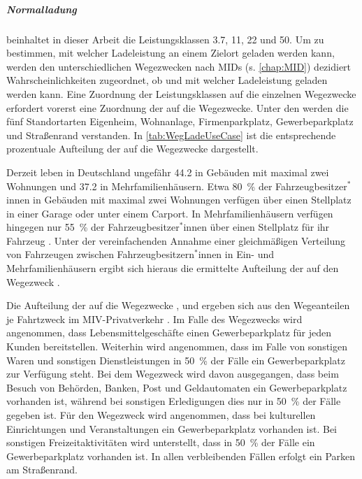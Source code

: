 \subparagraph{Normalladung} beinhaltet in dieser Arbeit die Leistungsklassen \SI{3.7}{\kw}, \SI{11}{\kw}, \SI{22}{\kw} und \SI{50}{\kw}.
Um zu bestimmen, mit welcher Ladeleistung an einem Zielort geladen werden kann, werden den unterschiedlichen Wegezwecken nach \glspl{MID} (s. \autoref{chap:MID}) dezidiert Wahrscheinlichkeiten zugeordnet, ob und mit welcher Ladeleistung geladen werden kann.
Eine Zuordnung der Leistungsklassen auf die einzelnen Wegezwecke erfordert vorerst eine Zuordnung der \UCs auf die Wegezwecke.
Unter den \UCs werden die fünf Standortarten Eigenheim, Wohnanlage, Firmenparkplatz, Gewerbeparkplatz und Straßenrand verstanden.
In \autoref{tab:WegLadeUseCase} ist die entsprechende prozentuale Aufteilung der \UCs auf die Wegezwecke dargestellt.



Derzeit leben in Deutschland ungefähr \SI{44.2}{\MioMen} in Gebäuden mit maximal zwei Wohnungen und \SI{37.2}{\MioMen} in Mehrfamilienhäusern.
Etwa \SI{80}{\percent} der \linebreak Fahrzeugbesitzer$^*$innen in Gebäuden mit maximal zwei Wohnungen verfügen über einen Stellplatz in einer Garage oder unter einem Carport.
In Mehrfamilienhäusern verfügen hingegen nur \SI{55}{\percent} der Fahrzeugbesitzer$^*$innen über einen Stellplatz für ihr Fahrzeug \cite{dena2020}.
Unter der vereinfachenden Annahme einer gleichmäßigen Verteilung von Fahrzeugen zwischen Fahrzeugbesitzern$^*$innen in Ein- und Mehrfamilienhäusern ergibt sich hieraus die ermittelte Aufteilung der \UCs auf den Wegezweck \nHdot.\medskip

Die Aufteilung der \UCs auf die Wegezwecke \Einkaufdot, \Erledigung und \Freizeit ergeben sich aus den Wegeanteilen je Fahrtzweck im \gls{MIV}-Privatverkehr \cite{Rikus2015}.
Im Falle des Wegezwecks \Einkauf wird angenommen, dass Lebensmittelgeschäfte einen Gewerbeparkplatz für jeden Kunden bereitstellen.
Weiterhin wird angenommen, dass im Falle von sonstigen Waren und sonstigen Dienstleistungen in \SI{50}{\percent} der Fälle ein Gewerbeparkplatz zur Verfügung steht.
Bei dem Wegezweck \Erledigung wird davon ausgegangen, dass beim Besuch von Behörden, Banken, Post und Geldautomaten ein Gewerbeparkplatz vorhanden ist, während bei sonstigen Erledigungen dies nur in \SI{50}{\percent} der Fälle gegeben ist.
Für den Wegezweck \Freizeit wird angenommen, dass bei kulturellen Einrichtungen und Veranstaltungen ein Gewerbeparkplatz vorhanden ist.
Bei sonstigen Freizeitaktivitäten wird unterstellt, dass in \SI{50}{\percent} der Fälle ein Gewerbeparkplatz vorhanden ist.
In allen verbleibenden Fällen erfolgt ein Parken am Straßenrand.\medskip


